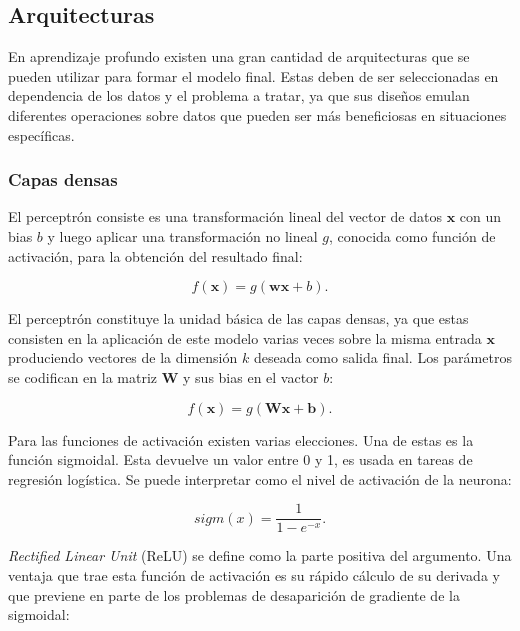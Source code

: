 \subsection{Arquitecturas}

En aprendizaje profundo existen una gran cantidad de arquitecturas que se pueden utilizar para formar el modelo 
final. Estas deben de ser seleccionadas en dependencia de los datos y el problema a tratar, ya que sus diseños 
emulan diferentes operaciones sobre datos que pueden ser más beneficiosas en situaciones específicas.

\subsubsection{Capas densas}

El perceptrón consiste es una transformación lineal del vector de datos $\textbf{x}$ con un bias $b$ y 
luego aplicar una transformación no lineal $g$, conocida como función de activación, 
para la obtención del resultado final:

\begin{equation}
	f(\textbf{x}) = g(\textbf{w}\textbf{x} + b).
\end{equation}

El perceptrón constituye la unidad básica de las capas densas, ya que estas consisten en la aplicación
de este modelo varias veces sobre la misma entrada $\textbf{x}$ produciendo vectores de la dimensión $k$ 
deseada como salida final. Los parámetros se codifican en la matriz $\textbf{W}$ y sus bias en el vactor $b$:

\begin{equation}
	f(\textbf{x}) = g(\textbf{Wx} + \textbf{b}).
\end{equation}

Para las funciones de activación existen varias elecciones. Una de estas es la función sigmoidal. 
Esta devuelve un valor entre 0 y 1, es usada en tareas de regresión logística. 
Se puede interpretar como el nivel de activación de la neurona:

\begin{equation}
	sigm(x) = \frac{1}{1-e^{-x}}.
\end{equation}

\emph{Rectified Linear Unit} (ReLU) se define como la parte positiva del argumento. Una ventaja que trae esta 
función de activación es su rápido cálculo de su derivada y que previene en parte de los problemas 
de desaparición de gradiente de la sigmoidal:

